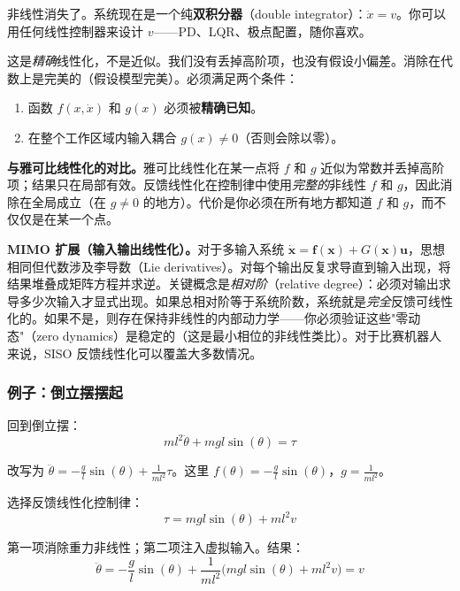 非线性消失了。系统现在是一个纯\textbf{双积分器}（double integrator）：$\ddot{x} = v$。你可以用任何线性控制器来设计 $v$——PD、LQR、极点配置，随你喜欢。

这是\textit{精确}线性化，不是近似。我们没有丢掉高阶项，也没有假设小偏差。消除在代数上是完美的（假设模型完美）。必须满足两个条件：
\begin{enumerate}[nosep]
    \item 函数 $f(x, \dot{x})$ 和 $g(x)$ 必须被\textbf{精确已知}。
    \item 在整个工作区域内输入耦合 $g(x) \neq 0$（否则会除以零）。
\end{enumerate}

\textbf{与雅可比线性化的对比。}雅可比线性化在某一点将 $f$ 和 $g$ 近似为常数并丢掉高阶项；结果只在局部有效。反馈线性化在控制律中使用\textit{完整的}非线性 $f$ 和 $g$，因此消除在全局成立（在 $g \neq 0$ 的地方）。代价是你必须在所有地方都知道 $f$ 和 $g$，而不仅仅是在某一个点。

\textbf{MIMO 扩展（输入输出线性化）。}对于多输入系统 $\dot{\mathbf{x}} = \mathbf{f}(\mathbf{x}) + G(\mathbf{x})\mathbf{u}$，思想相同但代数涉及李导数（Lie derivatives）。对每个输出反复求导直到输入出现，将结果堆叠成矩阵方程并求逆。关键概念是\textit{相对阶}（relative degree）：必须对输出求导多少次输入才显式出现。如果总相对阶等于系统阶数，系统就是\textit{完全}反馈可线性化的。如果不是，则存在保持非线性的内部动力学——你必须验证这些"零动态"（zero dynamics）是稳定的（这是最小相位的非线性类比）。对于比赛机器人来说，SISO 反馈线性化可以覆盖大多数情况。

\subsubsection{例子：倒立摆摆起}

回到倒立摆：
\begin{equation}
ml^2 \ddot{\theta} + mgl\sin(\theta) = \tau
\end{equation}

改写为 $\ddot{\theta} = -\frac{g}{l}\sin(\theta) + \frac{1}{ml^2}\tau$。这里 $f(\theta) = -\frac{g}{l}\sin(\theta)$，$g = \frac{1}{ml^2}$。

选择反馈线性化控制律：
\begin{equation}
\tau = mgl\sin(\theta) + ml^2 v
\end{equation}

第一项消除重力非线性；第二项注入虚拟输入。结果：
\begin{equation}
\ddot{\theta} = -\frac{g}{l}\sin(\theta) + \frac{1}{ml^2}\bigl(mgl\sin(\theta) + ml^2 v\bigr) = v
\end{equation}

